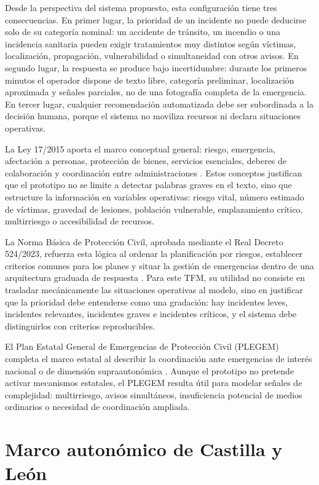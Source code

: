 Desde la perspectiva del sistema propuesto, esta configuración tiene tres consecuencias. En primer lugar, la prioridad de un incidente no puede deducirse solo de su categoría nominal: un accidente de tránsito, un incendio o una incidencia sanitaria pueden exigir tratamientos muy distintos según víctimas, localización, propagación, vulnerabilidad o simultaneidad con otros avisos. En segundo lugar, la respuesta se produce bajo incertidumbre: durante los primeros minutos el operador dispone de texto libre, categoría preliminar, localización aproximada y señales parciales, no de una fotografía completa de la emergencia. En tercer lugar, cualquier recomendación automatizada debe ser subordinada a la decisión humana, porque el sistema no moviliza recursos ni declara situaciones operativas.

La Ley 17/2015 aporta el marco conceptual general: riesgo, emergencia, afectación a personas, protección de bienes, servicios esenciales, deberes de colaboración y coordinación entre administraciones \cite{Ley17_2015}. Estos conceptos justifican que el prototipo no se limite a detectar palabras graves en el texto, sino que estructure la información en variables operativas: riesgo vital, número estimado de víctimas, gravedad de lesiones, población vulnerable, emplazamiento crítico, multirriesgo o accesibilidad de recursos.

La Norma Básica de Protección Civil, aprobada mediante el Real Decreto 524/2023, refuerza esta lógica al ordenar la planificación por riesgos, establecer criterios comunes para los planes y situar la gestión de emergencias dentro de una arquitectura graduada de respuesta \cite{RD524_2023}. Para este TFM, su utilidad no consiste en trasladar mecánicamente las situaciones operativas al modelo, sino en justificar que la prioridad debe entenderse como una gradación: hay incidentes leves, incidentes relevantes, incidentes graves e incidentes críticos, y el sistema debe distinguirlos con criterios reproducibles.

El Plan Estatal General de Emergencias de Protección Civil (PLEGEM) completa el marco estatal al describir la coordinación ante emergencias de interés nacional o de dimensión supraautonómica \cite{PLEGEM}. Aunque el prototipo no pretende activar mecanismos estatales, el PLEGEM resulta útil para modelar señales de complejidad: multirriesgo, avisos simultáneos, insuficiencia potencial de medios ordinarios o necesidad de coordinación ampliada.

\section{Marco autonómico de Castilla y León}

